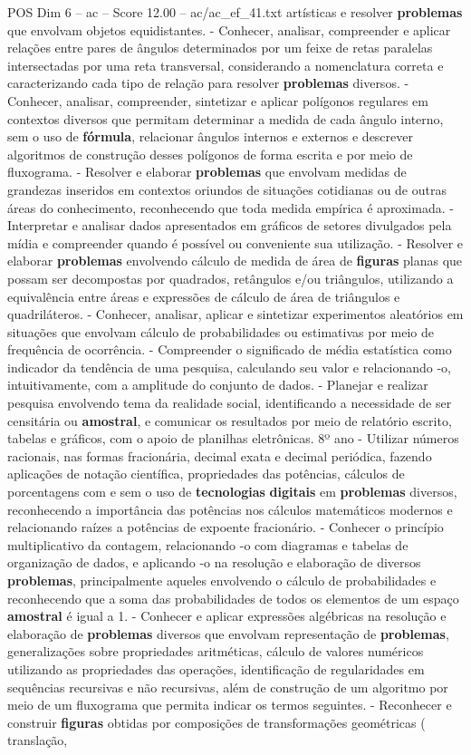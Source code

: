 \begin{textsample}{POS Dim 6 – ac – Score 12.00 – ac/ac\_ef\_41.txt}
artísticas e resolver \textbf{problemas} que envolvam objetos equidistantes. - Conhecer, analisar, compreender e aplicar relações entre pares de ângulos determinados por um feixe de retas paralelas intersectadas por uma reta transversal, considerando a nomenclatura correta e caracterizando cada tipo de relação para resolver \textbf{problemas} diversos. - Conhecer, analisar, compreender, sintetizar e aplicar polígonos regulares em contextos diversos que permitam determinar a medida de cada ângulo interno, sem o uso de \textbf{fórmula}, relacionar ângulos internos e externos e descrever algoritmos de construção desses polígonos de forma escrita e por meio de fluxograma. - Resolver e elaborar \textbf{problemas} que envolvam medidas de grandezas inseridos em contextos oriundos de situações cotidianas ou de outras áreas do conhecimento, reconhecendo que toda medida empírica é aproximada. - Interpretar e analisar dados apresentados em gráficos de setores divulgados pela mídia e compreender quando é possível ou conveniente sua utilização. - Resolver e elaborar \textbf{problemas} envolvendo cálculo de medida de área de \textbf{figuras} planas que possam ser decompostas por quadrados, retângulos e/ou triângulos, utilizando a equivalência entre áreas e expressões de cálculo de área de triângulos e quadriláteros. - Conhecer, analisar, aplicar e sintetizar experimentos aleatórios em situações que envolvam cálculo de probabilidades ou estimativas por meio de frequência de ocorrência. - Compreender o significado de média estatística como indicador da tendência de uma pesquisa, calculando seu valor e relacionando -o, intuitivamente, com a amplitude do conjunto de dados. - Planejar e realizar pesquisa envolvendo tema da realidade social, identificando a necessidade de ser censitária ou \textbf{amostral}, e comunicar os resultados por meio de relatório escrito, tabelas e gráficos, com o apoio de planilhas eletrônicas. 8º ano - Utilizar números racionais, nas formas fracionária, decimal exata e decimal periódica, fazendo aplicações de notação científica, propriedades das potências, cálculos de porcentagens com e sem o uso de \textbf{tecnologias} \textbf{digitais} em \textbf{problemas} diversos, reconhecendo a importância das potências nos cálculos matemáticos modernos e relacionando raízes a potências de expoente fracionário. - Conhecer o princípio multiplicativo da contagem, relacionando -o com diagramas e tabelas de organização de dados, e aplicando -o na resolução e elaboração de diversos \textbf{problemas}, principalmente aqueles envolvendo o cálculo de probabilidades e reconhecendo que a soma das probabilidades de todos os elementos de um espaço \textbf{amostral} é igual a 1. - Conhecer e aplicar expressões algébricas na resolução e elaboração de \textbf{problemas} diversos que envolvam representação de \textbf{problemas}, generalizações sobre propriedades aritméticas, cálculo de valores numéricos utilizando as propriedades das operações, identificação de regularidades em sequências recursivas e não recursivas, além de construção de um algoritmo por meio de um fluxograma que permita indicar os termos seguintes. - Reconhecer e construir \textbf{figuras} obtidas por composições de transformações geométricas ( translação, 
\end{textsample}
